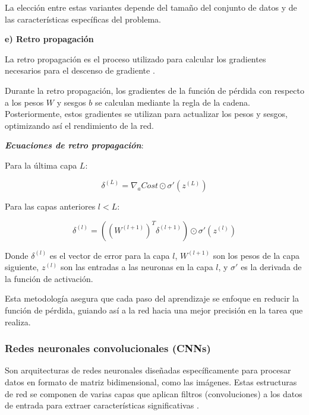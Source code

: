La elección entre estas variantes depende del tamaño del conjunto de datos y de las características específicas del problema.

\textbf{e) Retro propagación}

La retro propagación es el proceso utilizado para calcular los gradientes necesarios para el descenso de gradiente \cite{rashid2016make}.

Durante la retro propagación, los gradientes de la función de pérdida con respecto a los pesos \(W\) y sesgos \(b\) se calculan mediante la regla de la cadena. Posteriormente, estos gradientes se utilizan para actualizar los pesos y sesgos, optimizando así el rendimiento de la red.

\textbf{\textit{Ecuaciones de retro propagación}}:

Para la última capa \(L\):

\begin{equation}
    \delta^{(L)} = \nabla_a Cost \odot \sigma'(z^{(L)})
\end{equation}

Para las capas anteriores \(l < L\):

\begin{equation}
    \delta^{(l)} = ((W^{(l+1)})^T \delta^{(l+1)}) \odot \sigma'(z^{(l)})
\end{equation}

Donde \(\delta^{(l)}\) es el vector de error para la capa \(l\), \(W^{(l+1)}\) son los pesos de la capa siguiente, \(z^{(l)}\) son las entradas a las neuronas en la capa \(l\), y \(\sigma'\) es la derivada de la función de activación.

Esta metodología asegura que cada paso del aprendizaje se enfoque en reducir la función de pérdida, guiando así a la red hacia una mejor precisión en la tarea que realiza.

\subsubsection{Redes neuronales convolucionales (CNNs)}
Son arquitecturas de redes neuronales diseñadas específicamente para procesar datos en formato de matriz bidimensional, como las imágenes. Estas estructuras de red se componen de varias capas que aplican filtros (convoluciones) a los datos de entrada para extraer características significativas \cite{geron2019hands}.

